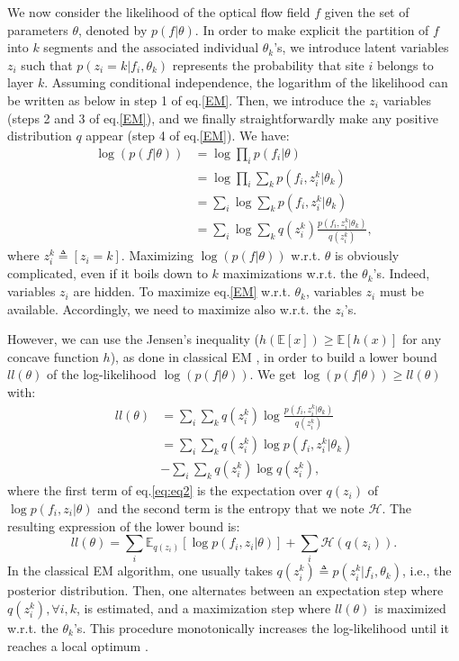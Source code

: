 \documentclass[10pt,twocolumn,letterpaper]{article}
\begin{document}
We now consider the likelihood of the optical flow field $f$ given the set of parameters $\theta$, denoted by $p(f|\theta)$. In order to make explicit the partition of $f$ into $k$ segments and the associated individual $\theta_k$'s, we introduce latent variables $z_i$ such that $p(z_i = k | f_i, \theta_k)$ represents the probability that site $i$ belongs to layer $k$. Assuming conditional independence, the logarithm of the likelihood can be written as below in step 1 of eq.\eqref{EM}. Then, we introduce the $z_i$ variables (steps 2 and 3 of eq.\eqref{EM}), and we finally straightforwardly make any positive distribution $q$ appear (step 4 of eq.\eqref{EM}). We have:
\begin{align}
\log(p(f|\theta)) &= \log \prod_i p(f_i | \theta) \nonumber \\
&= \log\prod_i\sum_k p(f_i, z_i^k | \theta_k) \nonumber \\
&= \sum_i\log \sum_k p(f_i, z_i^k | \theta_k) \nonumber \\
&= \sum_i\log \sum_k q(z_i^k) \frac{p(f_i, z_i^k | \theta_k)}{q(z_i^k)},
\label{EM}
\end{align}
 where $z_i^k \triangleq [z_i = k]$. Maximizing $\log(p(f|\theta))$ w.r.t. $\theta$ is obviously complicated, even if it boils down to $k$ maximizations w.r.t. the $\theta_k$'s. Indeed, variables $z_i$ are hidden. To maximize eq.\eqref{EM} w.r.t. $\theta_k$, variables $z_i$ must be available. Accordingly, we need to maximize also w.r.t. the $z_i$'s.


However, we can use the Jensen's inequality ($h(\mathbb E[x]) \geq \mathbb E[h(x)]$ for any concave function $h$), as done in classical EM \cite{murphy_book2012}, in order to build a lower bound $ll(\theta)$ of the log-likelihood $\log(p(f|\theta))$. We get $\log(p(f|\theta)) \geq ll(\theta)$ with:
\begin{align}
\label{eq:eq2}
ll(\theta)
&=\sum_i\sum_k q(z_i^k) \log \frac{p(f_i, z_i^k | \theta_k)}{q(z_i^k)} \nonumber\\
&=\sum_i \sum_k  q(z_i^k)  \log p(f_i, z_i^k | \theta_k) \nonumber \\ &- \sum_i \sum_k  q(z_i^k) \log q(z_i^k),
\end{align}
where the first term of eq.\eqref{eq:eq2} is the expectation over $q(z_i)$ of $\log p(f_i, z_i | \theta)$ and the second term is the entropy that we note $\mathcal H$. The resulting expression of the lower bound is: 
\begin{equation}
\label{eq-classicalEM}
ll(\theta)= \sum_i \mathbb E_{q(z_i)}[\log p(f_i , z_i | \theta) ] + \sum_i \mathcal H(q(z_i)).
\end{equation}
In the classical EM algorithm, one usually takes $q(z_i^k) \triangleq p(z_i^k|f_i, \theta_k)$, i.e., the posterior distribution. Then, one alternates between an expectation step where $q(z_i^k), \forall i, k$, is estimated, and a maximization step where $ll(\theta)$ is maximized w.r.t. the $\theta_k$'s. This procedure monotonically increases the log-likelihood until it reaches a local optimum \cite{murphy_book2012}. 
\end{document}
